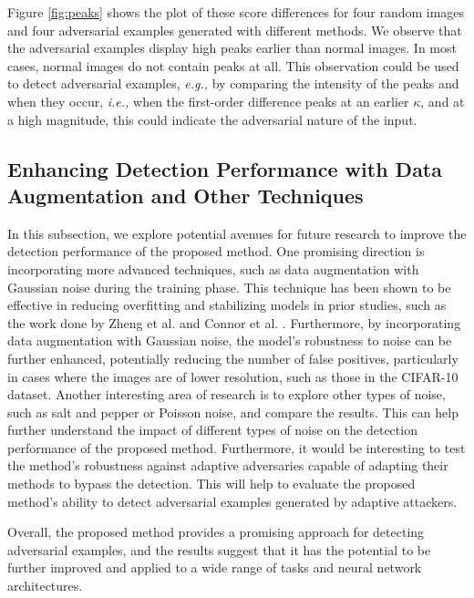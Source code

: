 Figure \ref{fig:peaks} shows the plot of these score differences for four random
images and four adversarial examples generated with different methods. We
observe that the adversarial examples display high peaks earlier than normal
images. In most cases, normal images do not contain peaks at all. This
observation could be used to detect adversarial examples, \emph{e.g.,} by
comparing the intensity of the peaks and when they occur, \emph{i.e.,} when the
first-order difference peaks at an earlier $\kappa$, and at a high magnitude,
this could indicate the adversarial nature of the input.

\subsection{Enhancing Detection Performance with Data Augmentation and Other Techniques}

In this subsection, we explore potential avenues for future research to improve
the detection performance of the proposed method. One promising direction is
incorporating more advanced techniques, such as data augmentation with Gaussian
noise during the training phase. This technique has been shown to be effective
in reducing overfitting and stabilizing models in prior studies, such as the
work done by Zheng et al. \cite{zheng_improving_2016} and Connor et al.
\cite{connor_survey_augmentation_2019}. Furthermore, by incorporating data
augmentation with Gaussian noise, the model's robustness to noise can be further
enhanced, potentially reducing the number of false positives, particularly in
cases where the images are of lower resolution, such as those in the CIFAR-10
dataset. Another interesting area of research is to explore other types of
noise, such as salt and pepper or Poisson noise, and compare the results. This
can help further understand the impact of different types of noise on the
detection performance of the proposed method. Furthermore, it would be
interesting to test the method's robustness against adaptive adversaries capable
of adapting their methods to bypass the detection. This will help to evaluate
the proposed method's ability to detect adversarial examples generated by
adaptive attackers.

Overall, the proposed method provides a promising approach for detecting
adversarial examples, and the results suggest that it has the potential to be
further improved and applied to a wide range of tasks and neural network
architectures.